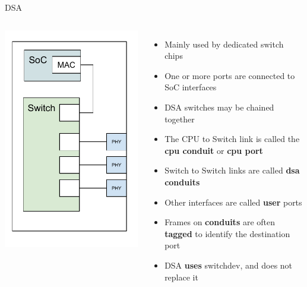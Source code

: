 \begin{frame}{DSA}
	\begin{columns}
		\includegraphics[width=\textwidth]{slides/networking-driver-switch/DSA.pdf}
	\begin{itemize}
		\item Mainly used by dedicated switch chips
		\item One or more ports are connected to SoC interfaces
		\item DSA switches may be chained together
		\item The CPU to Switch link is called the \textbf{cpu conduit} or \textbf{cpu port}
		\item Switch to Switch links are called \textbf{dsa conduits}
		\item Other interfaces are called \textbf{user} ports
		\item Frames on \textbf{conduits} are often \textbf{tagged} to identify the destination port
		\item DSA \textbf{uses} switchdev, and does not replace it
	\end{itemize}
	\end{columns}
\end{frame}

